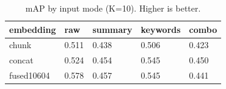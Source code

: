 \begin{table}
\caption{mAP by input mode (K=10). Higher is better.}
\label{tab:map-by-mode}
\begin{tabular}{lllll}
\toprule
embedding & raw & summary & keywords & combo \\
\midrule
chunk & 0.511 & 0.438 & 0.506 & 0.423 \\
concat & 0.524 & 0.454 & 0.545 & 0.450 \\
fused10604 & 0.578 & 0.457 & 0.545 & 0.441 \\
\bottomrule
\end{tabular}
\end{table}

